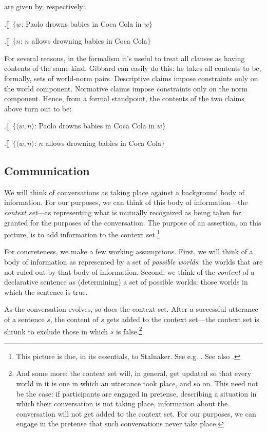 \documentclass[11pt,article,oneside]{memoir}
\begin{document}
are given by, respectively:

\ex.[] $\lbrace$$w$: Paolo drowns babies in Coca Cola in $w$$\rbrace$

\ex.[] $\lbrace$$n$: $n$ allows drowning babies in Coca Cola$\rbrace$

For several reasons, in the formalism it's useful to treat all clauses as having contents of the same kind. Gibbard can easily do this: he takes all contents to be, formally, sets of world-norm pairs. Descriptive claims impose constraints only on the world component. Normative claims impose constraints only on the norm component. Hence, from a formal standpoint, the contents of the two claims above turn out to be:

\ex.[] $\lbrace$$\langle w, n \rangle$: Paolo drowns babies in Coca Cola in $w$$\rbrace$

\ex.[] $\lbrace$$\langle w, n \rangle$: $n$ allows drowning babies in Coca Cola$\rbrace$


\subsection{Communication}

We will think of conversations as taking place against a background body of information. For our purposes, we can think of this body of information---the \emph{context set}---as representing what is mutually recognized as being taken for granted for the purposes of the conversation. The purpose of an assertion, on this picture, is to add information to the context set.\footnote{This picture is due, in its essentials, to Stalnaker. See  e.g. \citealt{stalnaker1973,stalnaker1978}. See also \citealt{lewis1979a}.}

For concreteness, we make a few working assumptions. First, we will think of a body of information as represented by a set of \emph{possible worlds}: the worlds that are not ruled out by that body of information. Second, we think of the \emph{content} of a declarative sentence as (determining) a set of possible worlds: those worlds in which the sentence is true. 

As the conversation evolves, so does the context set. After a successful utterance of a sentence $s$, the content of $s$ gets added to the context set---the context set is shrunk to exclude those in which $s$ is false.\footnote{And some more: the context set will, in general, get updated so that every world in it is one in which an utterance took place, and so on. This need not be the case: if participants are engaged in pretense, describing a situation in which their conversation is not taking place, information about the conversation will not get added to the context set. For our purposes, we can engage in the pretense that such conversations never take place.} 
\end{document}
